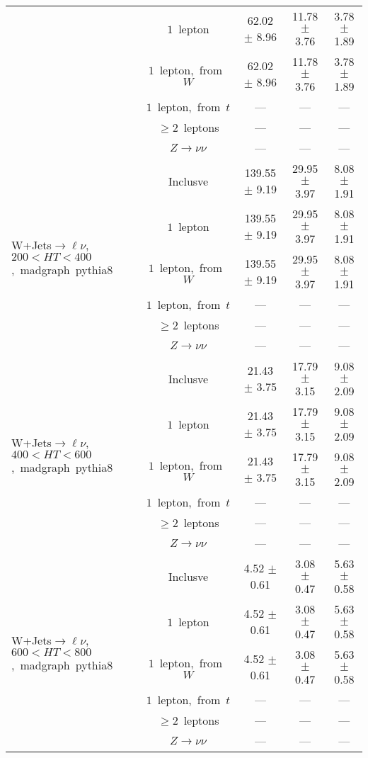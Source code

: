 \documentclass{article}
\begin{document}
\begin{longtable}{|l|c|c|c|c|}
 & $1$~lepton  & 62.02 $\pm$ 8.96  & 11.78 $\pm$ 3.76  & 3.78 $\pm$ 1.89 \\* 
 & $1$~lepton,~from~$W$  & 62.02 $\pm$ 8.96  & 11.78 $\pm$ 3.76  & 3.78 $\pm$ 1.89 \\* 
 & $1$~lepton,~from~$t$  & ---  & ---  & --- \\* 
 & $\ge2$~leptons  & ---  & ---  & --- \\* 
 & $Z\rightarrow\nu\nu$  & ---  & ---  & --- \\* 
\hline 
\multirow{6}{*}{W+Jets$\rightarrow\ell\nu$,~$200<HT<400$,~madgraph~pythia8} & Inclusve  & 139.55 $\pm$ 9.19  & 29.95 $\pm$ 3.97  & 8.08 $\pm$ 1.91 \\* 
 & $1$~lepton  & 139.55 $\pm$ 9.19  & 29.95 $\pm$ 3.97  & 8.08 $\pm$ 1.91 \\* 
 & $1$~lepton,~from~$W$  & 139.55 $\pm$ 9.19  & 29.95 $\pm$ 3.97  & 8.08 $\pm$ 1.91 \\* 
 & $1$~lepton,~from~$t$  & ---  & ---  & --- \\* 
 & $\ge2$~leptons  & ---  & ---  & --- \\* 
 & $Z\rightarrow\nu\nu$  & ---  & ---  & --- \\* 
\hline 
\multirow{6}{*}{W+Jets$\rightarrow\ell\nu$,~$400<HT<600$,~madgraph~pythia8} & Inclusve  & 21.43 $\pm$ 3.75  & 17.79 $\pm$ 3.15  & 9.08 $\pm$ 2.09 \\* 
 & $1$~lepton  & 21.43 $\pm$ 3.75  & 17.79 $\pm$ 3.15  & 9.08 $\pm$ 2.09 \\* 
 & $1$~lepton,~from~$W$  & 21.43 $\pm$ 3.75  & 17.79 $\pm$ 3.15  & 9.08 $\pm$ 2.09 \\* 
 & $1$~lepton,~from~$t$  & ---  & ---  & --- \\* 
 & $\ge2$~leptons  & ---  & ---  & --- \\* 
 & $Z\rightarrow\nu\nu$  & ---  & ---  & --- \\* 
\hline 
\multirow{6}{*}{W+Jets$\rightarrow\ell\nu$,~$600<HT<800$,~madgraph~pythia8} & Inclusve  & 4.52 $\pm$ 0.61  & 3.08 $\pm$ 0.47  & 5.63 $\pm$ 0.58 \\* 
 & $1$~lepton  & 4.52 $\pm$ 0.61  & 3.08 $\pm$ 0.47  & 5.63 $\pm$ 0.58 \\* 
 & $1$~lepton,~from~$W$  & 4.52 $\pm$ 0.61  & 3.08 $\pm$ 0.47  & 5.63 $\pm$ 0.58 \\* 
 & $1$~lepton,~from~$t$  & ---  & ---  & --- \\* 
 & $\ge2$~leptons  & ---  & ---  & --- \\* 
 & $Z\rightarrow\nu\nu$  & ---  & ---  & --- \\* 

\end{longtable}
\end{document}
